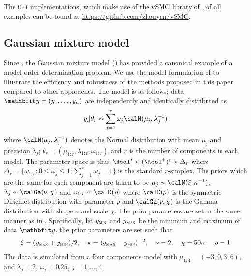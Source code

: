The \texttt{C++} implementations, which make use of the vSMC library of
\cite{software:VSMC}, of all examples can be found at
\url{https://github.com/zhouyan/vSMC}.

\subsection{Gaussian mixture model}
\label{sub:Gaussian mixture model}

Since \cite{Richardson:1997ea}, the Gaussian mixture model (\gmm) has
provided a canonical example of a model-order-determination problem. We use
the model formulation of \cite{DelMoral:2006hc} to illustrate the efficiency
and robustness of the methods proposed in this paper compared to other
approaches. The model is as follows; data $\data = (y_1,\dots,y_n)$ are
independently and identically distributed as
\begin{equation*}
  y_i|\theta_r \sim \sum_{j=1}^r \omega_j\calN(\mu_j,\lambda_j^{-1})
\end{equation*}
where $\calN(\mu_j,\lambda_j^{-1})$ denotes the Normal distribution with mean
$\mu_j$ and precision $\lambda_j$; $\theta_r =
(\mu_{1:r},\lambda_{1:r},\omega_{1:r})$ and $r$ is the number of components in
each model. The parameter space is thus $\Real^r \times (\Real^{+})^r\times
\Delta_r$ where $\Delta_r = \{\omega_{1:r}:0\le\omega_j\le1;
\sum_{j=1}^r\omega_j=1\}$ is the standard $r$-simplex. The priors which are
the same for each component are taken to be $\mu_j\sim\calN(\xi,\kappa^{-1})$,
$\lambda_j\sim\calGa(\nu,\chi)$ and $\omega_{1:r}\sim\calD(\rho)$ where
$\calD(\rho)$ is the symmetric Dirichlet distribution with parameter $\rho$
and $\calGa(\nu,\chi)$ is the Gamma distribution with shape $\nu$ and scale
$\chi$. The prior parameters are set in the same manner as in
\cite{Richardson:1997ea}. Specifically, let $y_{\text{\textsc{min}}}$ and
$y_{\text{\textsc{max}}}$ be the minimum and maximum of data $\data$, the
prior parameters are set such that
\begin{equation*}
  \xi = (y_{\text{\textsc{max}}} + y_{\text{\textsc{min}}}) / 2, \quad
  \kappa = (y_{\text{\textsc{max}}} - y_{\text{\textsc{min}}})^{-2}, \quad
  \nu = 2, \quad \chi = 50\kappa, \quad \rho = 1
\end{equation*}
The data is simulated from a four components model with $\mu_{1:4} = (-3, 0,3,
6)$, and $\lambda_j =2$, $\omega_j = 0.25$, $j = 1,\dots,4$.

